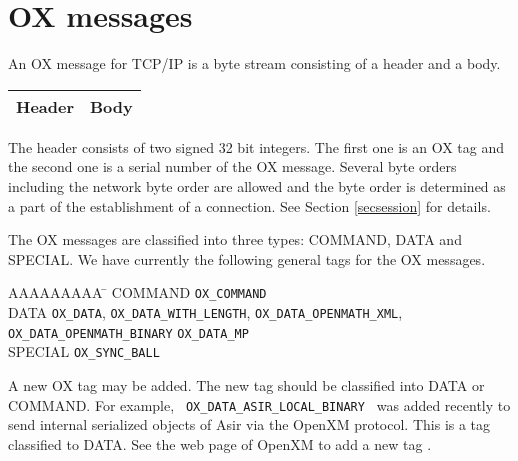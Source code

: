 
\section{OX messages}

An OX message for TCP/IP is a byte stream consisting of
a header and a body.
\begin{center}
\begin{tabular}{|c|c|}
\hline
Header	& \hspace{10mm} Body \hspace{10mm} \\
\hline
\end{tabular}
\end{center}
The header consists of two signed 32 bit integers.
The first one is an OX tag 
and the second one is a serial number of the OX message.
Several byte orders including the network byte order
are allowed and the byte order is determined as a part of
the establishment of a connection. See Section \ref{secsession} for details.

The OX messages are classified into three types:
COMMAND, DATA and SPECIAL.
We have currently the following general tags for the OX messages.
\begin{tabbing}
AAAAAAAAA \= \kill
COMMAND \> {\tt OX\_COMMAND}\\
DATA \> {\tt OX\_DATA}, {\tt OX\_DATA\_WITH\_LENGTH}, {\tt OX\_DATA\_OPENMATH\_XML},\\
\> {\tt OX\_DATA\_OPENMATH\_BINARY} {\tt OX\_DATA\_MP} \\
SPECIAL \> {\tt OX\_SYNC\_BALL}
\end{tabbing}
A new OX tag may be added.
The new tag should be classified into DATA or COMMAND.
For example, \verb+ OX_DATA_ASIR_LOCAL_BINARY +  was added recently
to send internal serialized objects of Asir via the OpenXM protocol.
This is a tag classified to DATA.
See the web page of OpenXM to add a new tag \cite{openxm-web}.

%
